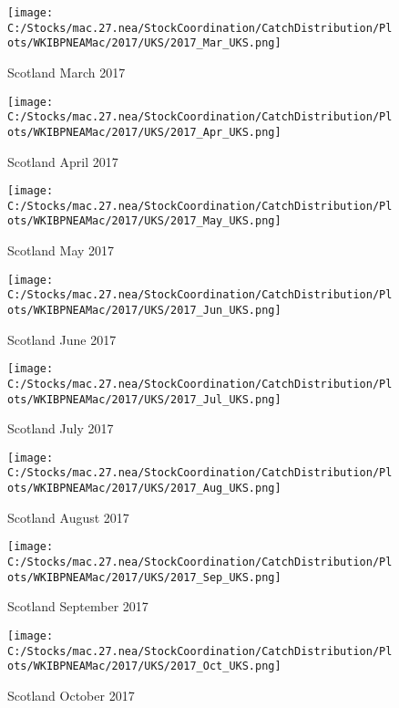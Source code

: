 \documentclass{article}
\begin{document}
\begin{figure}
	\centering
		\texttt{[image: C:/Stocks/mac.27.nea/StockCoordination/CatchDistribution/Plots/WKIBPNEAMac/2017/UKS/2017\_Mar\_UKS.png]}
	\caption{Scotland March 2017}
	\label{fig:2017_Mar_UKS}
\end{figure}

\begin{figure}
	\centering
		\texttt{[image: C:/Stocks/mac.27.nea/StockCoordination/CatchDistribution/Plots/WKIBPNEAMac/2017/UKS/2017\_Apr\_UKS.png]}
	\caption{Scotland April 2017}
	\label{fig:2017_Apr_UKS}
\end{figure}

\begin{figure}
	\centering
		\texttt{[image: C:/Stocks/mac.27.nea/StockCoordination/CatchDistribution/Plots/WKIBPNEAMac/2017/UKS/2017\_May\_UKS.png]}
	\caption{Scotland May 2017}
	\label{fig:2017_May_UKS}
\end{figure}

\begin{figure}
	\centering
		\texttt{[image: C:/Stocks/mac.27.nea/StockCoordination/CatchDistribution/Plots/WKIBPNEAMac/2017/UKS/2017\_Jun\_UKS.png]}
	\caption{Scotland June 2017}
	\label{fig:2017_Jun_UKS}
\end{figure}

\begin{figure}
	\centering
		\texttt{[image: C:/Stocks/mac.27.nea/StockCoordination/CatchDistribution/Plots/WKIBPNEAMac/2017/UKS/2017\_Jul\_UKS.png]}
	\caption{Scotland July 2017}
	\label{fig:2017_Jul_UKS}
\end{figure}

\begin{figure}
	\centering
		\texttt{[image: C:/Stocks/mac.27.nea/StockCoordination/CatchDistribution/Plots/WKIBPNEAMac/2017/UKS/2017\_Aug\_UKS.png]}
	\caption{Scotland August 2017}
	\label{fig:2017_Aug_UKS}
\end{figure}

\begin{figure}
	\centering
		\texttt{[image: C:/Stocks/mac.27.nea/StockCoordination/CatchDistribution/Plots/WKIBPNEAMac/2017/UKS/2017\_Sep\_UKS.png]}
	\caption{Scotland September 2017}
	\label{fig:2017_Sep_UKS}
\end{figure}

\begin{figure}
	\centering
		\texttt{[image: C:/Stocks/mac.27.nea/StockCoordination/CatchDistribution/Plots/WKIBPNEAMac/2017/UKS/2017\_Oct\_UKS.png]}
	\caption{Scotland October 2017}
	\label{fig:2017_Oct_UKS}
\end{figure}
\end{document}
